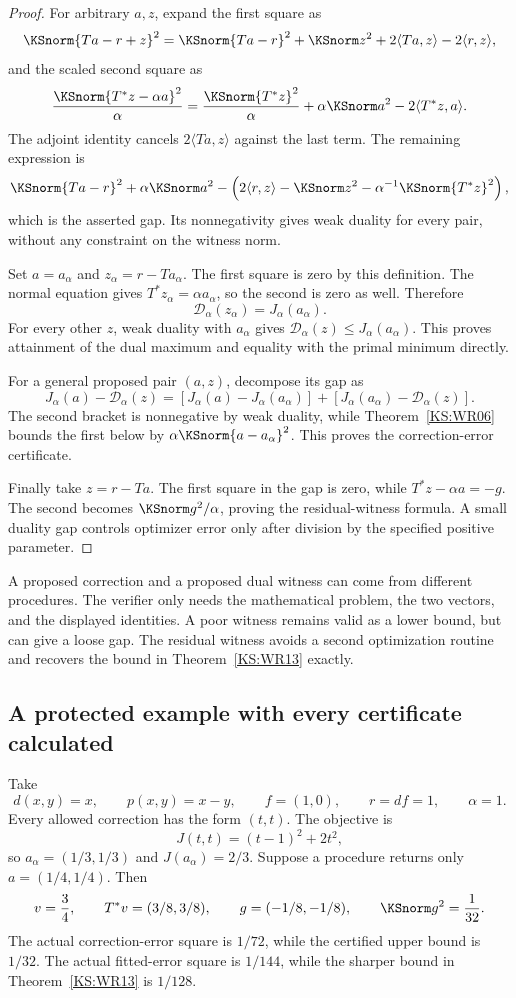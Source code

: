 \begin{proof}
For arbitrary $a,z$, expand the first square as
\[
 \KSnorm{Ta-r+z}^2
 =\KSnorm{Ta-r}^2+\KSnorm z^2+2\langle Ta,z\rangle-2\langle r,z\rangle,
\]
and the scaled second square as
\[
 \frac{\KSnorm{T^*z-\alpha a}^2}{\alpha}
 =\frac{\KSnorm{T^*z}^2}{\alpha}+\alpha\KSnorm a^2
       -2\langle T^*z,a\rangle.
\]
The adjoint identity cancels $2\langle Ta,z\rangle$ against the last term. The remaining expression is
\[
 \KSnorm{Ta-r}^2+\alpha\KSnorm a^2
 -\left(2\langle r,z\rangle-\KSnorm z^2
                    -\alpha^{-1}\KSnorm{T^*z}^2\right),
\]
which is the asserted gap. Its nonnegativity gives weak duality for every pair, without any constraint on the witness norm.

Set $a=a_\alpha$ and $z_\alpha=r-Ta_\alpha$. The first square is zero by this definition. The normal equation gives $T^*z_\alpha=\alpha a_\alpha$, so the second is zero as well. Therefore
\[
 \mathcal D_\alpha(z_\alpha)=J_\alpha(a_\alpha).
\]
For every other $z$, weak duality with $a_\alpha$ gives $\mathcal D_\alpha(z)\le J_\alpha(a_\alpha)$. This proves attainment of the dual maximum and equality with the primal minimum directly.

For a general proposed pair $(a,z)$, decompose its gap as
\[
 J_\alpha(a)-\mathcal D_\alpha(z)
 =[J_\alpha(a)-J_\alpha(a_\alpha)]
  +[J_\alpha(a_\alpha)-\mathcal D_\alpha(z)].
\]
The second bracket is nonnegative by weak duality, while Theorem~\ref{KS:WR06} bounds the first below by $\alpha\KSnorm{a-a_\alpha}^2$. This proves the correction-error certificate.

Finally take $z=r-Ta$. The first square in the gap is zero, while $T^*z-\alpha a=-g$. The second becomes $\KSnorm g^2/\alpha$, proving the residual-witness formula. A small duality gap controls optimizer error only after division by the specified positive parameter.
\end{proof}

A proposed correction and a proposed dual witness can come from different procedures. The verifier only needs the mathematical problem, the two vectors, and the displayed identities. A poor witness remains valid as a lower bound, but can give a loose gap. The residual witness avoids a second optimization routine and recovers the bound in Theorem~\ref{KS:WR13} exactly.

\subsection{A protected example with every certificate calculated}
Take
\[
 d(x,y)=x,\qquad p(x,y)=x-y,\qquad f=(1,0),\qquad r=df=1,\qquad\alpha=1.
\]
Every allowed correction has the form $(t,t)$. The objective is
\[
 J(t,t)=(t-1)^2+2t^2,
\]
so $a_\alpha=(1/3,1/3)$ and $J(a_\alpha)=2/3$. Suppose a procedure returns only $a=(1/4,1/4)$. Then
\[
 v=\frac34,\qquad T^*v=(3/8,3/8),\qquad
 g=(-1/8,-1/8),\qquad\KSnorm g^2=\frac1{32}.
\]
The actual correction-error square is $1/72$, while the certified upper bound is $1/32$. The actual fitted-error square is $1/144$, while the sharper bound in Theorem~\ref{KS:WR13} is $1/128$.

